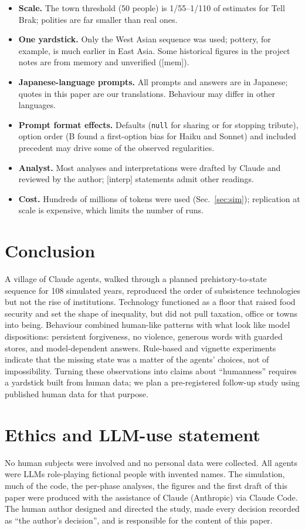 \documentclass[11pt]{article}
\newcommand{\lbl}[1]{\textsf{[#1]}}
\begin{document}
\begin{itemize}
  \item \textbf{Scale.} The town threshold (50 people) is 1/55--1/110 of estimates for Tell Brak; polities are far smaller than real ones.
  \item \textbf{One yardstick.} Only the West Asian sequence was used; pottery, for example, is much earlier in East Asia. Some historical figures in the project notes are from memory and unverified (\lbl{mem}).
  \item \textbf{Japanese-language prompts.} All prompts and answers are in Japanese; quotes in this paper are our translations. Behaviour may differ in other languages.
  \item \textbf{Prompt format effects.} Defaults (\texttt{null} for sharing or for stopping tribute), option order (B found a first-option bias for Haiku and Sonnet) and included precedent may drive some of the observed regularities.
  \item \textbf{Analyst.} Most analyses and interpretations were drafted by Claude and reviewed by the author; \lbl{interp} statements admit other readings.
  \item \textbf{Cost.} Hundreds of millions of tokens were used (Sec.~\ref{sec:sim}); replication at scale is expensive, which limits the number of runs.
\end{itemize}

\section{Conclusion}

A village of Claude agents, walked through a planned prehistory-to-state sequence for 108 simulated years, reproduced the order of subsistence technologies but not the rise of institutions. Technology functioned as a floor that raised food security and set the shape of inequality, but did not pull taxation, office or towns into being. Behaviour combined human-like patterns with what look like model dispositions: persistent forgiveness, no violence, generous words with guarded stores, and model-dependent answers. Rule-based and vignette experiments indicate that the missing state was a matter of the agents' choices, not of impossibility. Turning these observations into claims about ``humanness'' requires a yardstick built from human data; we plan a pre-registered follow-up study using published human data for that purpose.

\section*{Ethics and LLM-use statement}
No human subjects were involved and no personal data were collected. All agents were LLMs role-playing fictional people with invented names. The simulation, much of the code, the per-phase analyses, the figures and the first draft of this paper were produced with the assistance of Claude (Anthropic) via Claude Code. The human author designed and directed the study, made every decision recorded as ``the author's decision'', and is responsible for the content of this paper.
\end{document}
